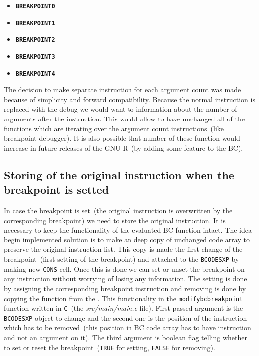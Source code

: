 \documentclass[thesis=M,english]{FITthesis}[2018/10/20]
\newcommand{\code}[1]{\texttt{#1}}
\begin{document}
\begin{itemize}
	\item \textbf{\code{BREAKPOINT0}}
	\item \textbf{\code{BREAKPOINT1}}
	\item \textbf{\code{BREAKPOINT2}}
	\item \textbf{\code{BREAKPOINT3}}
	\item \textbf{\code{BREAKPOINT4}}
\end{itemize}

The decision to make separate instruction for each argument count was made because of simplicity and forward compatibility. Because the normal instruction is replaced with the debug we would want to information about the number of arguments after the instruction. This would allow to have unchanged all of the functions which are iterating over the argument count instructions~(like breakpoint debugger). It is also possible that number of these function would increase in future releases of the GNU R~(by adding some feature to the BC).


\subsection{Storing of the original instruction when the breakpoint is setted}\label{storing-original-instructions}

In case the breakpoint is set~(the original instruction is overwritten by the corresponding breakpoint) we need to store the original instruction. It is necessary to keep the functionality of the evaluated BC function intact. 
The idea begin implemented solution is to make an deep copy of unchanged code array to preserve the original instruction list. This copy is made the first change of the breakpoint~(first setting of the breakpoint) and attached to the \code{BCODESXP} by making new \code{CONS} cell. Once this is done we can set or unset the breakpoint on any instruction without worrying of losing any information. The setting is done by assigning the corresponding breakpoint instruction and removing is done by copying the function from the . This functionality in the \code{modifybcbreakpoint} function written in \code{C}~(the \textit{src/main/main.c} file). First passed argument is the \code{BCODESXP} object to change and the second one is the position of the instruction which has to be removed~(this position in BC code array has to have instruction and not an argument on it). The third argument is boolean flag telling whether to set or reset the breakpoint~(\code{TRUE} for setting, \code{FALSE} for removing).
\end{document}
